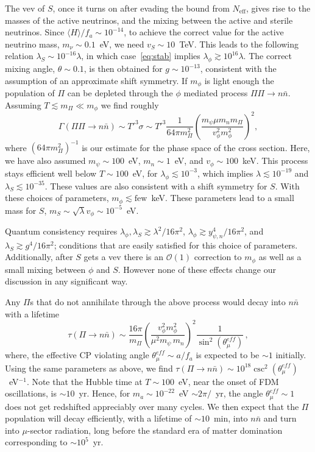 \documentclass[twocolumn,preprintnumbers,
endnote,prl]{revtex4-1}
\newcommand{\vev}[1]{\langle {#1} \rangle}
\newcommand{\lsim}{\lesssim}
\newcommand{\gsim}{\gtrsim}
\newcommand{\beq}{\begin{equation}}
\newcommand{\eeq}{\end{equation}}
\begin{document}
The vev of $S$, once it turns on after evading the bound from $N_{\text{eff}}$, gives rise to the masses of the active neutrinos, and the mixing between the active and sterile neutrinos. Since $\vev{H} / f_a \sim 10^{-14}$, to achieve the correct value for the active neutrino mass, $m_{\nu} \sim 0.1$~eV, we need $v_S \sim 10$~TeV. This leads to the following relation $\lambda_S \sim 10^{-16} \lambda$, in which case~\eqref{eq:stab} implies $\lambda_{\phi} \gsim 10^{16} \lambda$. The correct mixing angle, $\theta \sim 0.1$, is then obtained for $g \sim 10^{-13}$, consistent with the assumption of an approximate shift symmetry. If $m_{\phi}$ is light enough the population of $\Pi$ can be depleted through the $\phi$ mediated process $\Pi \Pi \to n \bar{n}$. Assuming $T \lsim m_{\Pi} \ll m_{\phi}$ we find roughly 
\begin{equation}
\Gamma (\Pi \Pi \to n \bar{n}) \sim T'^3 \sigma \sim T'^3 \frac{1}{64 \pi m_{\Pi}^2} \left(\frac{m_{\psi} \mu m_n m_{\Pi}}{v_{\phi}^2 m_{\phi}^2}\right)^2 ,
\end{equation}
where $(64 \pi m_{\Pi}^2)^{-1}$ is our estimate for the phase space of the cross section.  Here, we have also assumed $m_\psi \sim 100$~eV, $m_n\sim 1$~eV, and $v_\phi \sim 100$~keV.  This process stays efficient well below $T \sim 100$~eV, for $\lambda_{\phi} \lsim 10^{-3}$, which implies $\lambda \lsim 10^{-19}$ and $\lambda_S \lsim 10^{-35}$.  These values are also consistent with a shift symmetry for $S$.  With these choices of parameters, $m_\phi \lsim \text{few}$~keV.  These parameters lead to a small mass for $S$, $m_S \sim \sqrt{\lambda} v_{\phi} \sim 10^{-5}$~eV. 

Quantum consistency requires $\lambda_{\phi}, \lambda_S \gsim \lambda^2 / 16 \pi^2$, $\lambda_{\phi} \gsim y_{\psi, n}^4 / 16 \pi^2$, and $\lambda_S \gsim g^4 / 16 \pi^2$; conditions that are easily satisfied for this choice of parameters.  Additionally, after $S$ gets a vev there is an $\mathcal{O}(1)$ correction to $m_{\phi}$ as well as a small mixing between $\phi$ and $S$. However none of these effects change our discussion in any significant way.

Any $\Pi$s that do not annihilate through the above process would decay into $n \bar n$ with a lifetime
\beq
\tau (\Pi\to n\bar n) \sim \frac{16 \pi}{m_\Pi} \left(\frac{v_\phi^2 m_\phi^2}{\mu^2 m_\psi \, m_n}\right)^2 \frac{1}{\sin^2(\theta_\mu^{eff})} \,,
\label{tauPi}
\eeq
where, the effective CP violating angle $\theta_\mu^{eff} \sim a/f_a$ is expected to be $\sim 1$ initially.  Using the same parameters as above, we find $\tau (\Pi \to n \bar n) \sim 10^{18} \csc^2(\theta_\mu^{eff})$~eV$^{-1}$.  Note that the Hubble time at 
$T\sim 100$~eV, near the onset of FDM oscillations, is $\sim 10$~yr.  Hence, for $m_a \sim 10^{-22}$~eV $\sim 2 \pi /$~yr, the angle
$\theta_\mu^{eff} \sim 1$  does not get redshifted appreciably over many cycles.  
We then expect that the $\Pi$ population will decay efficiently, with a 
lifetime of $\sim 10$~min, into $n \bar n$ and turn into $\mu$-sector radiation,  
long before the standard era of matter domination corresponding to $\sim 10^5$~yr.
\end{document}
